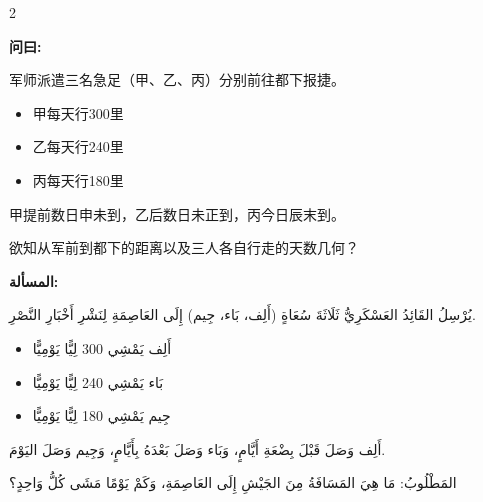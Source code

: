 \documentclass[11pt,a4paper]{article}
\newcommand{\ar}[1]{\arabicfont\beginR #1\endR}
\newenvironment{bilingual}{%
  \begin{paracol}{2}
}{%
  \end{paracol}
}
\newcommand{\cnlabel}[1]{\textcolor{algocolor}{\textbf{#1}}}
\newcommand{\arlabel}[1]{\ar{\textcolor{algocolor}{\textbf{#1}}}}
\begin{document}
\begin{bilingual}

\begin{leftcolumn*}
\cnlabel{问曰:}

军师派遣三名急足（甲、乙、丙）分别前往都下报捷。
\begin{itemize}
  \item 甲每天行300里
  \item 乙每天行240里
  \item 丙每天行180里
\end{itemize}
甲提前数日申未到，乙后数日未正到，丙今日辰末到。

欲知从军前到都下的距离以及三人各自行走的天数几何？
\end{leftcolumn*}

\begin{rightcolumn*}
\arlabel{المسألة:}

\ar{يُرْسِلُ القَائِدُ العَسْكَرِيُّ ثَلَاثَةَ سُعَاةٍ (أَلِف، بَاء، جِيم) إِلَى العَاصِمَةِ لِنَشْرِ أَخْبَارِ النَّصْرِ.}
\begin{itemize}
  \item \ar{أَلِف يَمْشِي 300 لِيًّا يَوْمِيًّا}
  \item \ar{بَاء يَمْشِي 240 لِيًّا يَوْمِيًّا}
  \item \ar{جِيم يَمْشِي 180 لِيًّا يَوْمِيًّا}
\end{itemize}

\ar{أَلِف وَصَلَ قَبْلَ بِضْعَةِ أَيَّامٍ، وَبَاء وَصَلَ بَعْدَهُ بِأَيَّامٍ، وَجِيم وَصَلَ اليَوْمَ.}

\ar{المَطْلُوبُ: مَا هِيَ المَسَافَةُ مِنَ الجَيْشِ إِلَى العَاصِمَةِ، وَكَمْ يَوْمًا مَشَى كُلُّ وَاحِدٍ؟}
\end{rightcolumn*}

\end{bilingual}

\vspace{1em}
\end{document}
